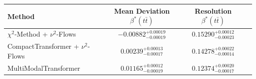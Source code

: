     \begin{tabular}{lccc}
        \toprule
        Method & Mean Deviation $\beta^*(t\bar{t})$ & Resolution $\beta^*(t\bar{t})$ \\
        \midrule
        $\chi^2$-Method + $\nu^2$-Flows & $-0.00882^{+0.00019}_{-0.00019}$ & $0.15290^{+0.00012}_{-0.00023}$ \\
        CompactTransformer + $\nu^2$-Flows & $0.00239^{+0.00013}_{-0.00017}$ & $0.14278^{+0.00022}_{-0.00014}$ \\
        MultiModalTransformer & $0.01165^{+0.00012}_{-0.00019}$ & $0.12374^{+0.00020}_{-0.00017}$ \\
        \bottomrule
    \end{tabular}